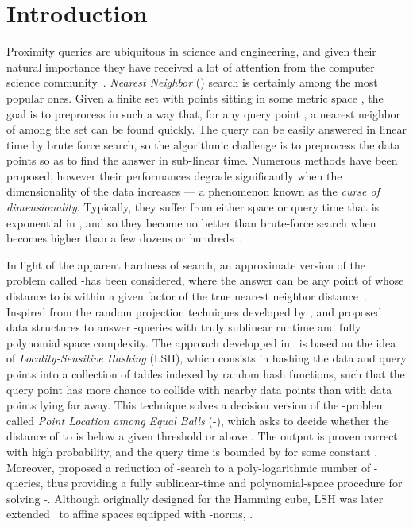 \section{Introduction}


Proximity queries are ubiquitous in science and engineering, and given
their natural importance they have received a lot of attention from
the computer science community~\citep{Clarkson99, Clarkson06, Indyk04,
  SDI05}. {\em Nearest Neighbor} (\nn) search is certainly among the
most popular ones. Given a finite set  with  points sitting in
some metric space , the goal is to preprocess  in such a
way that, for any query point , a nearest neighbor of 
among the set  can be found quickly.  The \nn query
can be easily answered in linear time by brute force search, so the
algorithmic challenge is to preprocess the data points so as to find
the answer in sub-linear time. Numerous methods have been proposed,
however their performances degrade significantly when the
dimensionality  of the data increases --- a phenomenon known as the
{\em curse of dimensionality}.  Typically, they suffer
from either space or query time that is exponential in  , and so
they become no better than brute-force search when  becomes higher
than a few dozens or hundreds~\cite{WSB98}.

In light of the apparent hardness of \nn search, an approximate
version of the problem called -\nn has been considered, where the
answer can be any point of  whose distance to  is
within a given factor  of the true nearest neighbor
distance~\citep{AMNSW98, Clarkson94, IM98, Kleinberg97,
  KOR98}. Inspired from the random projection techniques developed by
\citet{Kleinberg97}, \citet{IM98} and \citet{KOR98} proposed data
structures to answer -\nn queries with truly sublinear runtime and
fully polynomial space complexity. The approach developped
in~\cite{IM98} is based on the idea of {\em Locality-Sensitive
  Hashing} (LSH), which consists in hashing the data and query points
into a collection of tables indexed by random hash functions, such
that the query point  has more chance to collide with nearby data
points than with data points lying far away. This technique solves a
decision version of the -\nn problem called {\em Point Location
  among Equal Balls} (-\pleb), which asks to decide whether
the distance of  to  is below a given threshold
 or above .  The output is proven correct with high
probability, and the query time is bounded by 
for some constant . Moreover,
\citet{IM98} proposed a reduction of -\nn search to a
poly-logarithmic number of -\pleb queries, thus providing a
fully sublinear-time and polynomial-space procedure for solving
-\nn. Although originally designed for the Hamming cube, LSH was
later extended~\cite{AI06, DIIM04, HarPeledIndykMotwani} to affine
spaces  equipped with -norms, .


